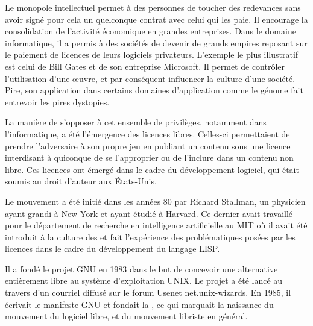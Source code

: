 Le monopole intellectuel permet à des personnes de toucher des redevances sans avoir signé pour cela un quelconque contrat avec celui qui les paie. Il encourage la consolidation de l'activité économique en grandes entreprises. Dans le domaine informatique, il a permis à des sociétés de devenir de grands empires reposant sur le paiement de licences de leurs logiciels privateurs. L'exemple le plus illustratif est celui de Bill Gates et de son entreprise Microsoft. Il permet de contrôler l'utilisation d'une œuvre, et par conséquent influencer la culture d'une société. Pire, son application dans certains domaines d'application comme le génome fait entrevoir les pires dystopies.

La manière de s'opposer à cet ensemble de privilèges, notamment dans l'informatique, a été l'émergence des licences libres. Celles-ci permettaient de prendre l'adversaire à son propre jeu en publiant un contenu sous une licence interdisant à quiconque de se l'approprier ou de l'inclure dans un contenu non libre. Ces licences ont émergé dans le cadre du développement logiciel, qui était soumis au droit d'auteur aux États-Unis.

Le mouvement a été initié dans les années 80 par Richard Stallman, un physicien ayant grandi à New York et ayant étudié à Harvard. Ce dernier avait travaillé pour le département de recherche en intelligence artificielle au MIT où il avait été introduit à la culture des  et fait l'expérience des problématiques posées par les licences dans le cadre du développement du langage LISP.

Il a fondé le projet GNU en 1983 dans le but de concevoir une alternative entièrement libre au système d'exploitation UNIX. Le projet a été lancé au travers d'un courriel diffusé sur le forum Usenet net.unix-wizards. En 1985, il écrivait le manifeste GNU et fondait la , ce qui marquait la naissance du mouvement du logiciel libre, et du mouvement libriste en général.

